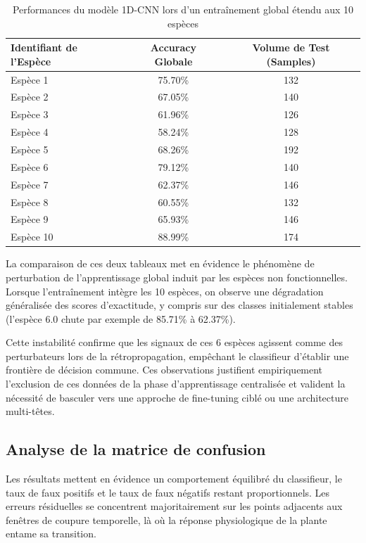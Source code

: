 \documentclass[12pt,a4paper,twoside]{article}
\begin{document}
\begin{table}[htbp]
\centering
\caption{Performances du modèle 1D-CNN lors d'un entraînement global étendu aux 10 espèces}
\label{tab:acc_10especes}
\begin{tabular}{lcc}
\toprule
\textbf{Identifiant de l'Espèce} & \textbf{Accuracy Globale} & \textbf{Volume de Test (Samples)} \\ 
\midrule
Espèce 1 & 75.70\% & 132 \\
Espèce 2 & 67.05\% & 140 \\
Espèce 3 & 61.96\% & 126 \\
Espèce 4 & 58.24\% & 128 \\
Espèce 5 & 68.26\% & 192 \\
Espèce 6 & 79.12\% & 140 \\
Espèce 7 & 62.37\% & 146 \\
Espèce 8 & 60.55\% & 132 \\
Espèce 9 & 65.93\% & 146 \\
Espèce 10 & 88.99\% & 174 \\
\bottomrule
\end{tabular}
\end{table}

La comparaison de ces deux tableaux met en évidence le phénomène de perturbation de l'apprentissage global induit par les espèces non fonctionnelles. Lorsque l'entraînement intègre les 10 espèces, on observe une dégradation généralisée des scores d'exactitude, y compris sur des classes initialement stables (l'espèce 6.0 chute par exemple de \num{85.71}\% à \num{62.37}\%). 

Cette instabilité confirme que les signaux de ces 6 espèces agissent comme des perturbateurs lors de la rétropropagation, empêchant le classifieur d'établir une frontière de décision commune. Ces observations justifient empiriquement l'exclusion de ces données de la phase d'apprentissage centralisée et valident la nécessité de basculer vers une approche de fine-tuning ciblé ou une architecture multi-têtes.

\subsection{Analyse de la matrice de confusion}
\label{subsec:matrice_confusion}

Les résultats mettent en évidence un comportement équilibré du classifieur, le taux de faux positifs et le taux de faux négatifs restant proportionnels. Les erreurs résiduelles se concentrent majoritairement sur les points adjacents aux fenêtres de coupure temporelle, là où la réponse physiologique de la plante entame sa transition.
\end{document}
